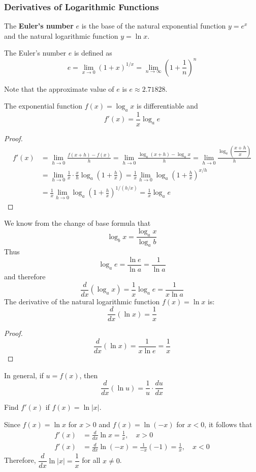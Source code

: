 \subsubsection*{Derivatives of Logarithmic Functions}
The \textbf{Euler's number} \(e\) is the base of the natural exponential
function \(y=e^x\) and the natural logarithmic function \(y=\ln x\).
\begin{definition}
    The Euler's number \(e\) is defined as
    \[e=\lim_{x\to 0}(1+x)^{1/x}
    =\lim_{n\to\infty}\left(1+\frac{1}{n}\right)^n\]
\end{definition}
Note that the approximate value of \(e\) is \(e\approx2.71828\).
\begin{theorem}
    The exponential function \(f(x)=\log_a x\) is differentiable and
    \[f'(x)=\frac{1}{x}\log_a e\]
\end{theorem}
\begin{proof}
    \begin{align*}
        f'(x) &= \lim_{h\to 0}\frac{f(x+h)-f(x)}{h}
        = \lim_{h\to 0}\frac{\log_a(x+h)-\log_a x}{h}
        =\lim_{h\to 0}\frac{\log_a\left(\dfrac{x+h}{x}\right)}{h} \\
        &= \lim_{h\to 0}\frac{1}{x}\cdot\frac{x}{h}
        \log_a\left(1+\frac{h}{x}\right)
        = \frac{1}{x}
            \lim_{h\to 0}\log_a\left(1+\frac{h}{x}\right)^{x/h} \\
        &=\frac{1}{x}
            \lim_{h\to 0}\log_a\left(1+\frac{h}{x}\right)^{1/(h/x)}
        =\frac{1}{x}\log_a e
    \end{align*}
\end{proof}
We know from the change of base formula that
\[\log_b x=\frac{\log_a x}{\log_a b}\]
Thus
\[\log_a e=\frac{\ln e}{\ln a}=\frac{1}{\ln a}\]
and therefore
\[\frac{d}{dx}(\log_a x)=\frac{1}{x}\log_a e=\frac{1}{x\ln a}\]
The derivative of the natural logarithmic function \(f(x)=\ln x\) is:
\[\frac{d}{dx}(\ln x)=\frac{1}{x}\]
\begin{proof}
    \[\frac{d}{dx}(\ln x)=\frac{1}{x\ln e}=\frac{1}{x}\]
\end{proof}
In general, if \(u=f(x)\), then
\[\frac{d}{dx}(\ln u)=\frac{1}{u}\cdot\frac{du}{dx}\]
\begin{problem}
    Find \(f'(x)\) if \(f(x)=\ln|x|\).
\end{problem}
\begin{solution}
    Since \(f(x)=\ln x\) for \(x>0\) and \(f(x)=\ln(-x)\) for \(x<0\),
    it follows that
    \begin{align*}
        f'(x) &= \frac{d}{dx}\ln x=\frac{1}{x},\quad x>0 \\
        f'(x) &= \frac{d}{dx}\ln(-x)=\frac{1}{-x}(-1)=\frac{1}{x},\quad x<0
    \end{align*}
    Therefore, \(\dfrac{d}{dx}\ln|x|=\dfrac{1}{x}\) for all \(x\neq 0\).
\end{solution}

